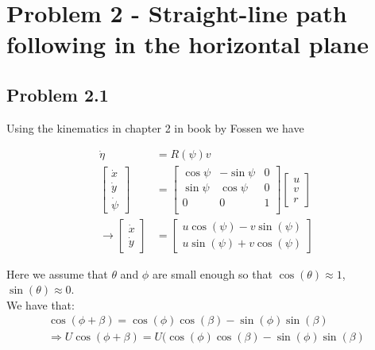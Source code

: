 \section*{Problem 2 - Straight-line path following in the horizontal plane}

\subsection*{Problem 2.1}

Using the kinematics in chapter 2 in book by Fossen \cite{Fossen2011} we have

\begin{align}
    \dot{\eta} &= R(\psi)v \\
    \begin{bmatrix}
    \dot{x} \\
    \dot{y} \\
    \dot{\psi}
    \end{bmatrix} 
    &=
    \begin{bmatrix}
    \cos{\psi} & -\sin{\psi} & 0 \\
    \sin{\psi} & \cos{\psi} & 0 \\
    0 & 0 & 1 \\        
    \end{bmatrix}
    \begin{bmatrix}
    u \\
    v \\
    r
    \end{bmatrix} \\
    \rightarrow 
    \begin{bmatrix}
    \dot{x} \\
    \dot{y}
    \end{bmatrix}
    &=
    \begin{bmatrix}
    u\cos(\psi) - v\sin(\psi) \\
    u\sin(\psi) + v\cos(\psi) 
    \end{bmatrix}
\end{align}

Here we assume that $\theta$ and $\phi$ are small enough so that $\cos(\theta) \approx 1$, $\sin(\theta) \approx 0$.\\

We have that: 
\begin{align}
    \cos(\phi + \beta) = \cos(\phi)\cos(\beta) - \sin(\phi)\sin(\beta) \\
    \Rightarrow U\cos(\phi + \beta) = U(\cos(\phi)\cos(\beta) - \sin(\phi)\sin(\beta) \\
\end{align}

